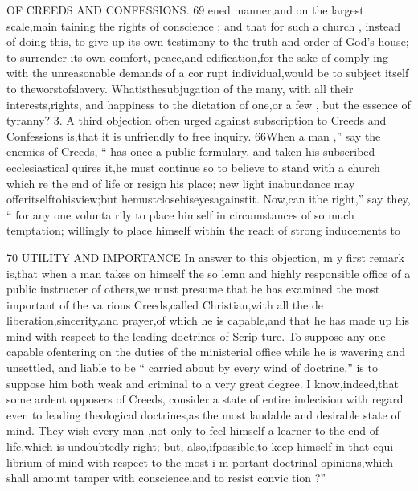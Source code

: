 \documentclass[
]{book}
\begin{document}
OF CREEDS AND CONFESSIONS. 69
ened manner,and on the largest scale,main taining the rights of conscience ; and that for
such a church , instead of doing this, to give up its own testimony to the truth and order of
God's house; to surrender its own comfort, peace,and edification,for the sake of comply
ing with the unreasonable demands of a cor rupt individual,would be to subject itself to
theworstofslavery. Whatisthesubjugation
of the many, with all their interests,rights,
and happiness to the dictation of one,or a few , but the essence of tyranny?
3. A third objection often urged against subscription to Creeds and Confessions is,that it is unfriendly to free inquiry.
66When a man ,'' say the enemies of Creeds, `` has once
a public formulary, and taken his
subscribed
ecclesiastical
quires it,he must continue so to believe to
stand with a church which re
the end of life or resign his place; new light inabundance may offeritselftohisview;but hemustclosehiseyesagainstit. Now,can
itbe right,'' say they, `` for any one volunta
rily to place himself in circumstances
of so
much temptation; willingly to place himself within the reach of strong inducements to

70 UTILITY AND IMPORTANCE
In answer to this objection, m y first remark
is,that when a man takes on himself the so
lemn and highly responsible office of a public
instructer of others,we must presume that he
has examined the most important of the va
rious Creeds,called Christian,with all the de
liberation,sincerity,and prayer,of which he
is capable,and that he has made up his mind
with respect to the leading doctrines of Scrip
ture. To suppose any one capable ofentering on the duties of the ministerial office while he
is wavering and unsettled, and liable to be
`` carried about by every wind of doctrine,'' is to suppose him both weak and criminal to a
very great degree. I know,indeed,that some ardent opposers of Creeds, consider a state of entire indecision with regard even to leading theological doctrines,as the most laudable and desirable state of mind. They wish every man ,not only to feel himself a learner to the end of life,which is undoubtedly right; but,
also,ifpossible,to keep himself in that equi librium of mind with respect to the most i m
portant doctrinal opinions,which shall amount
tamper with conscience,and to resist convic tion ?''
\end{document}
